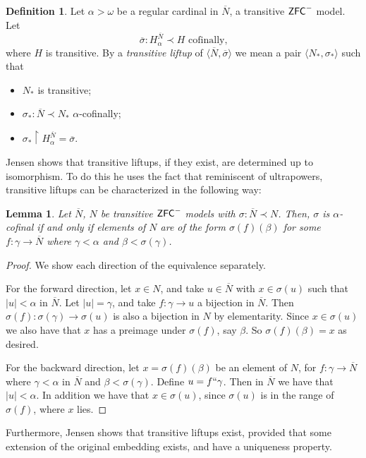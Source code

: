 \documentclass{amsart}
\newtheorem{lemma}[theorem]{Lemma}
\theoremstyle{definition}
\newtheorem{definition}[theorem]{Definition}
\theoremstyle{remark}
\newcommand{\N}{{\overline{N}}}
\newcommand{\ZFC}{\textup{\ensuremath{\textsf{ZFC}}}}
\begin{document}
\begin{definition} Let $\alpha > \omega$ be a regular cardinal in $\N$, a transitive $\ZFC^-$ model. Let 
	$$\overline \sigma: H^{\N}_\alpha \prec H \text{ cofinally,}$$ where $H$ is transitive. By a \emph{transitive liftup} of $\langle \N, \overline \sigma \rangle$ we mean a pair $\langle N_* , \sigma_* \rangle$ such that 
\begin{itemize} 
	\item $N_*$ is transitive;
	\item $\sigma_*:\N \prec N_*$ $\alpha$-cofinally;
	\item $\sigma_* \upharpoonright H_{\alpha}^{\N}= \overline \sigma$. \qedhere
\end{itemize}	
\end{definition}

Jensen \cite[Lemma 3.1]{Jensen:2014} shows  that transitive liftups, if they exist, are determined up to isomorphism. To do this he uses the fact that reminiscent of ultrapowers, transitive liftups can be characterized in the following way:
\begin{lemma}\label{lemma:liftupchar} Let $\N$, $N$ be transitive $\ZFC^-$ models with $\sigma: \N \prec N$. Then,
$\sigma$ is $\alpha$-cofinal if and only if elements of $N$ are of the form $\sigma(f)(\beta)$ for some $f: \gamma \to \overline N$ where $\gamma < \alpha$ and $\beta < \sigma(\gamma)$. \end{lemma} 
\begin{proof} We show each direction of the equivalence separately.

For the forward direction, let $x \in N$, and take $u \in \overline N$ with $x \in \sigma(u)$ such that $|u| <\alpha$ in $\overline N$. Let $|u|=\gamma$, and take $f:\gamma \to u$ a bijection in $\overline N$. Then $\sigma(f):\sigma(\gamma) \to \sigma(u)$ is also a bijection in $N$ by elementarity. Since $x \in \sigma(u)$ we also have that $x$ has a preimage under $\sigma(f)$, say $\beta$. So $\sigma(f)(\beta)=x$ as desired.

For the backward direction, let $x=\sigma(f)(\beta)$ be an element of $N$, for $f:\gamma \to \overline N$ where $\gamma < \alpha$ in $\overline N$ and $\beta < \sigma(\gamma)$. Define $u = f``\gamma$. Then in $\overline N$ we have that $|u|<\alpha$. In addition we have that $x \in \sigma(u)$, since $\sigma(u)$ is in the range of $\sigma(f)$, where $x$ lies.
\end{proof}

Furthermore, Jensen shows that transitive liftups exist, provided that some extension of the original embedding exists, and have a uniqueness property.
\end{document}
